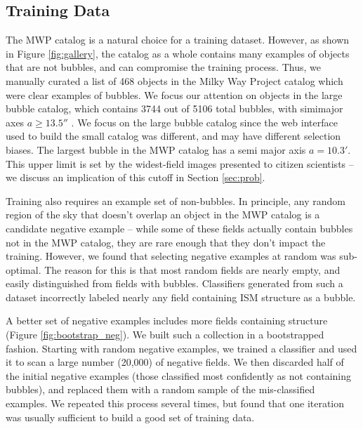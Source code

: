 \subsection{Training Data}
\label{sec:method_training_data}
The MWP catalog is a natural choice for a training dataset. However, as shown in Figure \ref{fig:gallery}, the catalog as a whole contains many examples of objects that are not bubbles, and can compromise the training process. Thus, we manually curated a list of 468 objects in the Milky Way Project catalog which were clear examples of bubbles. We focus our attention on objects in the large bubble catalog, which contains 3744 out of 5106 total bubbles, with simimajor axes  $a \geq 13.5''$  \citep{Simpson12}. We focus on the large bubble catalog since the web interface used to build the small catalog was different, and may have different selection biases. The largest bubble in the MWP catalog has a semi major axis $a=10.3'$. This upper limit is set by the widest-field images presented to citizen scientists -- we discuss an implication of this cutoff in Section \ref{sec:prob}.

Training also requires an example set of non-bubbles. In principle, any random region of the sky that doesn't overlap an object in the MWP catalog is a candidate negative example -- while some of these fields actually contain bubbles not in the MWP catalog, they are rare enough that they don't  impact the training. However, we found that selecting negative examples at random was sub-optimal. The reason for this is that most random fields are nearly empty, and easily distinguished from fields with bubbles. Classifiers generated from such a dataset incorrectly labeled nearly any field containing ISM structure as a bubble.

A better set of negative examples includes more fields containing structure (Figure \ref{fig:bootstrap_neg}). We built such a collection in a bootstrapped fashion. Starting with random negative examples, we trained a classifier and used it to scan a large number (20,000) of negative fields. We then discarded half of the initial negative examples (those classified most confidently as not containing bubbles), and replaced them with a random sample of the mis-classified examples. We repeated this process several times, but found that one iteration was usually sufficient to build a good set of training data.

